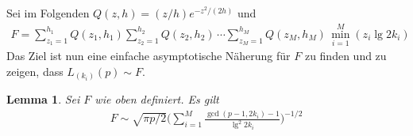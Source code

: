 \documentclass[a4paper, 11pt, ngerman]{article}
\theoremstyle{definition}
\theoremstyle{plain}
\newtheorem{lemma}{Lemma}
\theoremstyle{remark}
\begin{document}
Sei im Folgenden $Q(z, h) = (z/h) e^{-z^2/(2h)}$ und
\begin{align*}
    F =
    \sum_{z_1 = 1}^{h_1} Q(z_1, h_1)
    \sum_{z_2 = 1}^{h_2} Q(z_2, h_2) \, \cdots
    \sum_{z_M = 1}^{h_M} Q(z_M, h_M)
    \, \min_{i = 1}^M(z_i \lg 2k_i)
\end{align*}
Das Ziel ist nun eine einfache asymptotische Näherung für $F$ zu finden und zu zeigen, dass $L_{(k_i)}(p) \sim F$.

\begin{lemma}
    Sei $F$ wie oben definiert. Es gilt
    \begin{align*}
        F \sim \sqrt{\pi p / 2} \Bigg ( \sum_{i = 1}^M \frac {\gcd(p - 1, 2k_i) - 1} {\lg^2 2k_i} \Bigg )^{-1/2}
    \end{align*}

    \label{lemma:f-asmyp}
\end{lemma}
\end{document}
